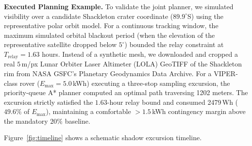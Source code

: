 \documentclass[10pt,conference]{IEEEtran}
\begin{document}
\textbf{Executed Planning Example.}
To validate the joint planner, we simulated visibility over a candidate Shackleton crater coordinate ($89.9^\circ$S) using the representative polar orbit model. For a continuous tracking window, the maximum simulated orbital blackout period (when the elevation of the representative satellite dropped below $5^\circ$) bounded the relay constraint at $T_{\mathrm{relay}} = 1.63$ hours. Instead of a synthetic mesh, we downloaded and cropped a real $5$\,m/px Lunar Orbiter Laser Altimeter (LOLA) GeoTIFF of the Shackleton rim from NASA GSFC's Planetary Geodynamics Data Archive. For a VIPER-class rover ($E_{\max} = 5.0$\,kWh) executing a three-stop sampling excursion, the priority-queue A* planner computed an optimal path traversing 1202 meters. The excursion strictly satisfied the $1.63$-hour relay bound and consumed 2479\,Wh ($49.6\%$ of $E_{\max}$), maintaining a comfortable $>1.5$\,kWh contingency margin above the mandatory $20\%$ baseline.

Figure~\ref{fig:timeline} shows a schematic shadow excursion timeline.
\end{document}
